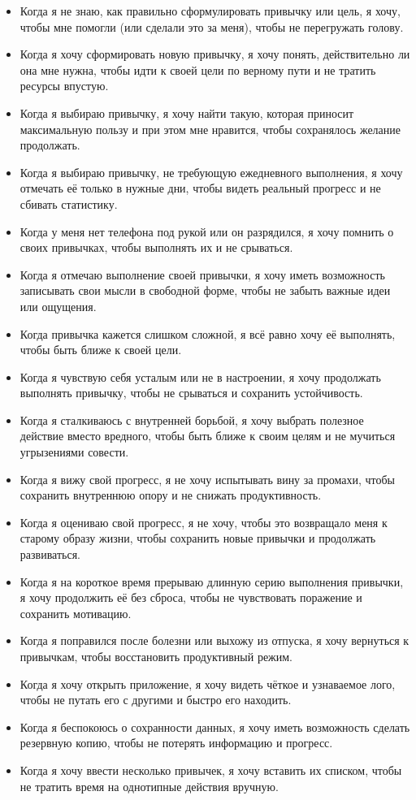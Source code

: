\documentclass[pdflatex,sn-mathphys-num]{sn-jnl}%
\theoremstyle{thmstyleone}%
\theoremstyle{thmstyletwo}%
\theoremstyle{thmstylethree}%
\begin{document}
\begin{itemize}
    \item Когда я не знаю, как правильно сформулировать привычку или цель, я хочу, чтобы мне помогли (или сделали это за меня), чтобы не перегружать голову.
    \item Когда я хочу сформировать новую привычку, я хочу понять, действительно ли она мне нужна, чтобы идти к своей цели по верному пути и не тратить ресурсы впустую.
    \item Когда я выбираю привычку, я хочу найти такую, которая приносит максимальную пользу и при этом мне нравится, чтобы сохранялось желание продолжать.
    \item Когда я выбираю привычку, не требующую ежедневного выполнения, я хочу отмечать её только в нужные дни, чтобы видеть реальный прогресс и не сбивать статистику.
    \item Когда у меня нет телефона под рукой или он разрядился, я хочу помнить о своих привычках, чтобы выполнять их и не срываться.
    \item Когда я отмечаю выполнение своей привычки, я хочу иметь возможность записывать свои мысли в свободной форме, чтобы не забыть важные идеи или ощущения.
    \item Когда привычка кажется слишком сложной, я всё равно хочу её выполнять, чтобы быть ближе к своей цели.
    \item Когда я чувствую себя усталым или не в настроении, я хочу продолжать выполнять привычку, чтобы не срываться и сохранить устойчивость.
    \item Когда я сталкиваюсь с внутренней борьбой, я хочу выбрать полезное действие вместо вредного, чтобы быть ближе к своим целям и не мучиться угрызениями совести.
    \item Когда я вижу свой прогресс, я не хочу испытывать вину за промахи, чтобы сохранить внутреннюю опору и не снижать продуктивность.
    \item Когда я оцениваю свой прогресс, я не хочу, чтобы это возвращало меня к старому образу жизни, чтобы сохранить новые привычки и продолжать развиваться.
    \item Когда я на короткое время прерываю длинную серию выполнения привычки, я хочу продолжить её без сброса, чтобы не чувствовать поражение и сохранить мотивацию.
    \item Когда я поправился после болезни или выхожу из отпуска, я хочу вернуться к привычкам, чтобы восстановить продуктивный режим.
    \item Когда я хочу открыть приложение, я хочу видеть чёткое и узнаваемое лого, чтобы не путать его с другими и быстро его находить.
    \item Когда я беспокоюсь о сохранности данных, я хочу иметь возможность сделать резервную копию, чтобы не потерять информацию и прогресс.
    \item Когда я хочу ввести несколько привычек, я хочу вставить их списком, чтобы не тратить время на однотипные действия вручную.
\end{itemize}
\end{document}
